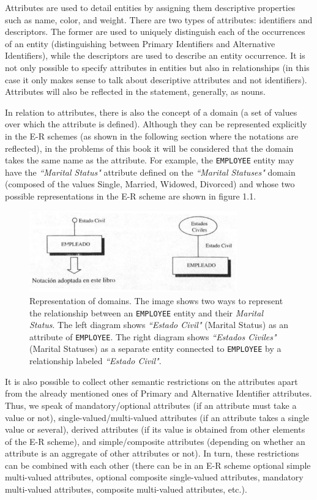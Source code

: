 \documentclass{article}
\begin{document}
Attributes are used to detail entities by assigning them descriptive properties such as name, color, and weight.  There are two types of attributes: identifiers and descriptors.  The former are used to uniquely distinguish each of the occurrences of an entity (distinguishing between Primary Identifiers and Alternative Identifiers), while the descriptors are used to describe an entity occurrence.  It is not only possible to specify attributes in entities but also in relationships (in this case it only makes sense to talk about descriptive attributes and not identifiers).  Attributes will also be reflected in the statement, generally, as nouns.

In relation to attributes, there is also the concept of a domain (a set of values over which the attribute is defined).  Although they can be represented explicitly in the E-R schemes (as shown in the following section where the notations are reflected), in the problems of this book it will be considered that the domain takes the same name as the attribute.  For example, the \texttt{EMPLOYEE} entity may have the \textit{``Marital Status"} attribute defined on the \textit{``Marital Statuses"} domain (composed of the values Single, Married, Widowed, Divorced) and whose two possible representations in the E-R scheme are shown in figure 1.1.

\begin{figure}
    \centering
    \includegraphics[width=0.8\textwidth]{figures/fig1}
    \caption{Representation of domains. The image shows two ways to represent the relationship between an \texttt{EMPLOYEE} entity and their \textit{Marital Status}. The left diagram shows \textit{``Estado Civil"} (Marital Status) as an attribute of \texttt{EMPLOYEE}. The right diagram shows \textit{``Estados Civiles"} (Marital Statuses) as a separate entity connected to \texttt{EMPLOYEE} by a relationship labeled \textit{``Estado Civil"}.}
    \label{fig:fig1.1}
\end{figure}

It is also possible to collect other semantic restrictions on the attributes apart from the already mentioned ones of Primary and Alternative Identifier attributes.  Thus, we speak of mandatory/optional attributes (if an attribute must take a value or not), single-valued/multi-valued attributes (if an attribute takes a single value or several), derived attributes (if its value is obtained from other elements of the E-R scheme), and simple/composite attributes (depending on whether an attribute is an aggregate of other attributes or not).  In turn, these restrictions can be combined with each other (there can be in an E-R scheme optional simple multi-valued attributes, optional composite single-valued attributes, mandatory multi-valued attributes, composite multi-valued attributes, etc.).
\end{document}
